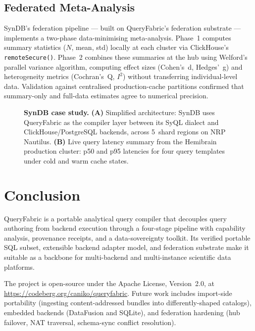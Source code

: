 \documentclass[11pt,a4paper]{article}
\begin{document}
\subsection{Federated Meta-Analysis}

SynDB's federation pipeline --- built on QueryFabric's federation
substrate --- implements a two-phase data-minimising meta-analysis.
Phase~1 computes summary statistics ($N$, mean, std) locally at each
cluster via ClickHouse's \texttt{remoteSecure()}.
Phase~2 combines these summaries at the hub using Welford's parallel
variance algorithm, computing effect sizes (Cohen's~d, Hedges'~g)
and heterogeneity metrics (Cochran's~Q, $I^2$) without transferring
individual-level data.
Validation against centralised production-cache partitions confirmed
that summary-only and full-data estimates agree to numerical precision.

\begin{figure}[ht]
  \centering
  
  \caption{\textbf{SynDB case study.}
    \textbf{(A)} Simplified architecture: SynDB uses QueryFabric as the
    compiler layer between its SyQL dialect and ClickHouse/PostgreSQL
    backends, across 5~shard regions on NRP Nautilus.
    \textbf{(B)} Live query latency summary from the Hemibrain production
    cluster: p50 and p95 latencies for four query templates under cold
    and warm cache states.}
  \label{fig:syndb}
\end{figure}

\section{Conclusion}
\label{sec:conclusion}

QueryFabric is a portable analytical query compiler that decouples query
authoring from backend execution through a four-stage pipeline with
capability analysis, provenance receipts, and a data-sovereignty toolkit.
Its verified portable SQL subset, extensible backend adapter model, and
federation substrate make it suitable as a backbone for multi-backend
and multi-instance scientific data platforms.

The project is open-source under the Apache License, Version~2.0, at
\url{https://codeberg.org/caniko/queryfabric}.
Future work includes import-side portability (ingesting content-addressed
bundles into differently-shaped catalogs), embedded backends (DataFusion
and SQLite), and federation hardening (hub failover, NAT traversal,
schema-sync conflict resolution).
\end{document}
